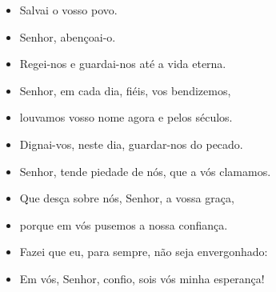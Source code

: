 \begin{itemize}
  \item[] Salvai o vosso povo.
  \item[] Senhor, abençoai-o.
  \item[] Regei-nos e guardai-nos até a vida eterna.
  \item[] Senhor, em cada dia, fiéis, vos bendizemos,
  \item[] louvamos vosso nome agora e pelos séculos.
  \item[] Dignai-vos, neste dia, guardar-nos do pecado.
  \item[] Senhor, tende piedade de nós, que a vós clamamos.
  \item[] Que desça sobre nós, Senhor, a vossa graça,
  \item[] porque em vós pusemos a nossa confiança.
  \item[] Fazei que eu, para sempre, não seja envergonhado:
  \item[] Em vós, Senhor, confio, sois vós minha esperança!
\end{itemize}